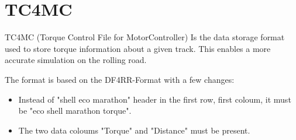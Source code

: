 \section{TC4MC}

TC4MC (Torque Control File for MotorController) Is the data storage format used to store torque information about a given track. This enables a more accurate simulation on the rolling road. 

The format is based on the DF4RR-Format with a few changes:

\begin{itemize}
	\item Instead of "shell eco marathon" header in the first row, first coloum, it must be "eco shell marathon torque".
	\item  The two data coloums "Torque" and "Distance" must be present.
\end{itemize}

